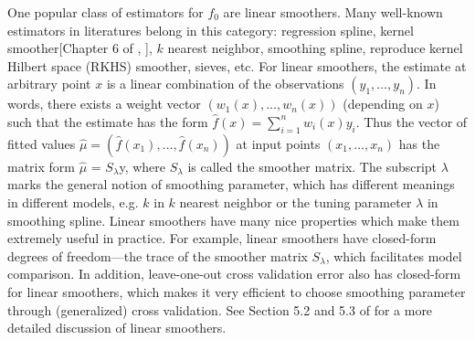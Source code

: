 \documentclass[a4paper]{article}
\begin{document}
One popular class of estimators for $f_0$ are linear smoothers. Many well-known estimators in literatures belong in this category: regression spline\cite{de1978practical}, kernel smoother[Chapter 6 of \cite{friedman2001elements}, \cite{loader2006local}], $k$ nearest neighbor, smoothing spline\cite{de1978practical,wahba1990spline,green1993nonparametric}, reproduce kernel Hilbert space (RKHS) smoother\cite{smola1998learning,wahba1990spline}, sieves\cite{shen1994convergence,wong1995probability}, etc.  For linear smoothers, the estimate at arbitrary point $x$ is a linear combination of the observations $(y_1,\ldots, y_n)$. In words, there exists a weight vector $(w_1(x), \ldots, w_n(x))$ (depending on $x$) such that the estimate has the form $\hat{f}(x) = \sum_{i=1}^n w_i(x)y_i$. Thus the vector of fitted values $\hat{\mu} = (\hat{f}(x_1), \ldots, \hat{f}(x_n))$ at input points $(x_1, \ldots, x_n)$ has the matrix form $\hat{\mu}$ = $S_\lambda$y, where $S_\lambda$ is called the smoother matrix. The subscript $\lambda$ marks the general notion of smoothing parameter, which has different meanings in different models, e.g. $k$ in $k$ nearest neighbor or the tuning parameter $\lambda$ in smoothing spline. Linear smoothers have many nice properties which make them extremely useful in practice. For example, linear smoothers have closed-form degrees of freedom\cite{efron1986biased}---the trace of the smoother matrix $S_\lambda$, which facilitates model comparison. In addition, leave-one-out cross validation error also has closed-form for linear smoothers, which makes it very efficient to choose smoothing parameter through (generalized) cross validation. See Section 5.2 and 5.3 of \cite{wasserman2007all} for a more detailed discussion of linear smoothers.
\end{document}
